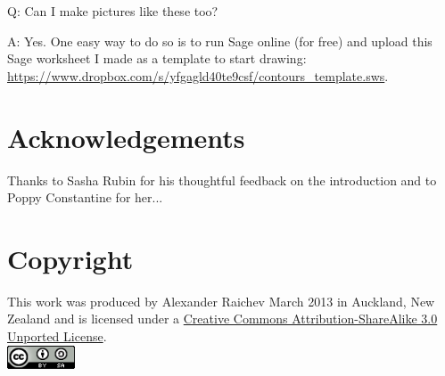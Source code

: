 \documentclass[12pt, a4paper]{amsart}
\begin{document}
Q: Can I make pictures like these too?

A: Yes.
One easy way to do so is to run Sage online (for free) and upload this Sage worksheet I made as a template to start drawing:
\url{https://www.dropbox.com/s/yfgagld40te9csf/contours_template.sws}.

\section*{Acknowledgements}
Thanks to Sasha Rubin for his thoughtful feedback on the introduction and to Poppy Constantine for her...

\section*{Copyright}

This work was produced by Alexander Raichev March 2013 in Auckland, New Zealand and is licensed under a \href{http://creativecommons.org/licenses/by-sa/3.0/deed.en_US}{Creative Commons Attribution-ShareAlike 3.0 Unported License}.\\[1em]
\includegraphics[width=20mm]{cc_by_sa.png}
\end{document}
